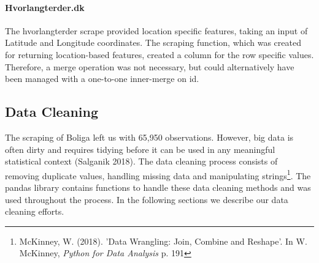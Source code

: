 \documentclass[12pt,a4paper]{article}
\begin{document}
\paragraph{Hvorlangterder.dk\newline}
The hvorlangterder scrape provided location specific features, taking an input of Latitude and Longitude coordinates. The scraping function, which was created for returning location-based features, created a column for the row specific values. Therefore, a merge operation was not necessary, but could alternatively have been managed with a one-to-one inner-merge on id.  

\subsection{Data Cleaning}
The scraping of Boliga left us with 65,950 observations. However, big data is often dirty and requires tidying before it can be used in any meaningful statistical context (Salganik 2018). The data cleaning process consists of removing duplicate values, handling missing data and manipulating strings\footnote{McKinney, W. (2018). 'Data Wrangling: Join, Combine and Reshape'. In W. McKinney, \textit{Python for Data Analysis} p. 191}. The pandas library contains functions to handle these data cleaning methods and was used throughout the process. In the following sections we describe our data cleaning efforts. 
\end{document}

